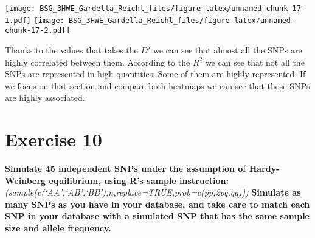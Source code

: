 \documentclass[]{article}
\begin{document}
\texttt{[image: BSG\_3HWE\_Gardella\_Reichl\_files/figure-latex/unnamed-chunk-17-1.pdf]}
\texttt{[image: BSG\_3HWE\_Gardella\_Reichl\_files/figure-latex/unnamed-chunk-17-2.pdf]}

Thanks to the values that takes the \(D'\) we can see that almost all
the SNPs are highly correlated between them. According to the \(R^2\) we
can see that not all the SNPs are represented in high quantities. Some
of them are highly represented. If we focus on that section and compare
both heatmaps we can see that those SNPs are highly associated.

\section{Exercise 10}\label{exercise-10}

\textbf{Simulate 45 independent SNPs under the assumption of
Hardy-Weinberg equilibrium, using R's sample instruction:}
\emph{(sample(c(`AA',`AB',`BB'),n,replace=TRUE,prob=c(p\emph{p,2}p\emph{q,q}q)))}
\textbf{Simulate as many SNPs as you have in your database, and take
care to match each SNP in your database with a simulated SNP that has
the same sample size and allele frequency.}
\end{document}
